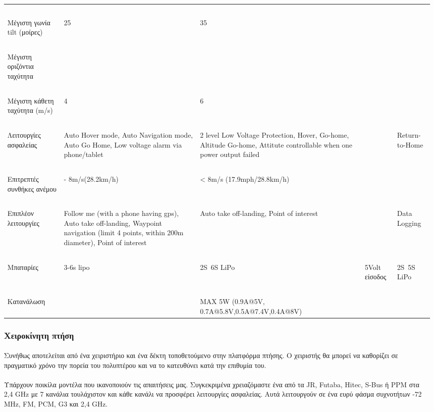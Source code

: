 \documentclass[a4paper, 12pt, twoside]{report}
\begin{document}
{{{{{{\begin{landscape}
\begin{longtable} { m{3cm} m{3.5cm} m{3.5cm} m{3.5cm} m{3.5cm} }
					\hdashline
					~\\
					Μέγιστη γωνία tilt (μοίρες) & 25 & 35 & & \\
					\hdashline
					~\\
					Μέγιστη οριζόντια ταχύτητα &  & & & \\
					\hdashline
					~\\
					Μέγιστη κάθετη ταχύτητα (m/s) & 4 & 6 & & \\
					\hdashline
					~\\
					Λειτουργίες ασφαλείας & Auto Hover mode, Auto Navigation mode, Auto Go Home, Low voltage alarm via phone/tablet & 2 level Low Voltage Protection, Hover, Go-home, Altitude Go-home, Attitute controllable when one power output failed & & Return-to-Home\\
					\hdashline
					~\\
					Επιτρεπτές συνθήκες ανέμου & - 8m/s(28.2km/h) & < 8m/s (17.9mph/28.8km/h) & & \\
					\hdashline
					~\\
					Επιπλέον λειτουργίες & Follow me (with a phone having gps), Auto take off-landing, Waypoint navigation (limit 4 points, within 200m diameter), Point of interest & Auto take off-landing, Point of interest & & Data Logging\\
					\hdashline
					~\\
					Μπαταρίες & 3-6s lipo & 2S~6S LiPo & 5Volt είσοδος & 2S~5S LiPo\\
					\hdashline
					~\\
					Κατανάλωση & & MAX 5W (0.9A@5V, 0.7A@5.8V,0.5A@7.4V,0.4A@8V) & & \\
					\hline
				\end{longtable}
				\end{landscape}

		
		\subsubsection{Xειροκίνητη πτήση}
			\paragraph{}{Συνήθως αποτελείται από ένα χειριστήριο και ένα δέκτη τοποθετούμενο στην πλατφόρμα πτήσης. Ο χειριστής θα μπορεί να καθορίζει σε πραγματικό χρόνο την πορεία του πολυπτέρου και να το κατευθύνει κατά την επιθυμία του.
			}
			\paragraph{}{Υπάρχουν ποικίλα μοντέλα που ικανοποιούν τις απαιτήσεις μας. Συγκεκριμένα χρειαζόμαστε ένα από τα JR, Futaba, Hitec, S-Bus ή PPM στα 2,4 GHz με 7 κανάλια τουλάχιστον και κάθε κανάλι να προσφέρει λειτουργίες ασφαλείας. Αυτά λειτουργούν σε ένα ευρύ φάσμα συχνοτήτων -72 MHz, FM, PCM, G3 και 2,4 GHz.
			}
			
}}}}}}
\end{document}
